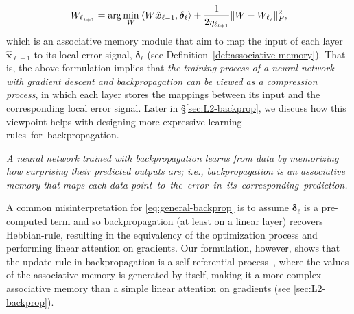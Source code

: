 \begin{align}\label{eq:backprop-simple}
    {W_{\ell}}_{_{t+1}} = \arg \min_{W} \: \langle W \hat{\boldsymbol{x}}_{\ell - 1},  \boldsymbol{\delta}_{\ell} \rangle + \frac{1}{2 \eta_{\ell_{t+1}}}\| W - {W_{\ell}}_{_{t}} \|_F^{2}, 
\end{align}
which is an associative memory module that aim to map the input of each layer $\hat{\boldsymbol{x}}_{\ell - 1}$ to its local error signal, $\boldsymbol{\delta}_{\ell}$ (see Definition~\ref{def:associative-memory}). That is, the above formulation implies that \textit{the training process of a neural network with gradient descent and backpropagation can be viewed as a compression process}, in which each layer stores the mappings between its input and the corresponding local error signal. Later in \S\ref{sec:L2-backprop}, we discuss how this viewpoint helps with designing more expressive learning rules~for~backpropagation.  

\vspace{8pt}
 \begin{myboxi}
     \textit{A neural network trained with backpropagation learns from data by memorizing how surprising their predicted outputs are; i.e., backpropagation is an associative memory that maps each data point~to~the~error~in~its~corresponding~prediction. }
 \end{myboxi}

 A common misinterpretation for \autoref{eq:general-backprop} is to assume $\boldsymbol{\delta}_{\ell}$ is a pre-computed term and so backpropagation (at least on a linear layer) recovers Hebbian-rule, resulting in the equivalency of the optimization process and performing linear attention on gradients. Our formulation, however, shows that the update rule in backpropagation is a self-referential process~\citep{schmidhuber1993self}, where the values of the associative memory is generated by itself, making it a more complex associative memory than a simple linear attention on gradients (see \autoref{sec:L2-backprop}).  




